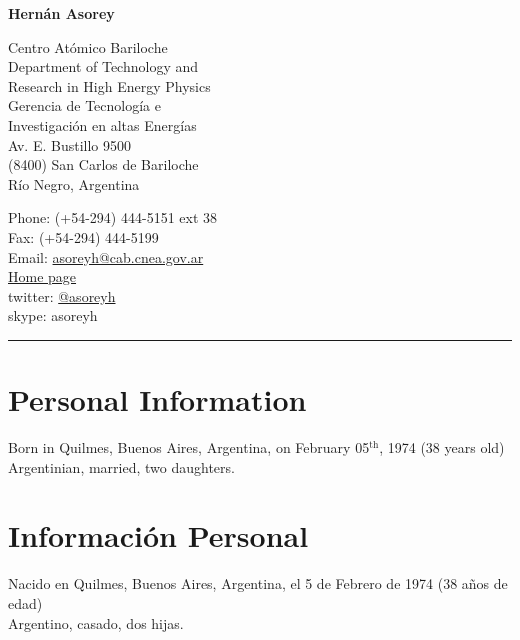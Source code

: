 \begin{center}{\huge \bf Hernán Asorey}\\[1cm]\end{center}
\begin{minipage}[t]{0.495\textwidth}
  Centro Atómico Bariloche\\
\ifeng
  Department of Technology and\\
  Research in High Energy Physics\\
\else
  Gerencia de Tecnología e \\
  Investigación en altas Energías\\
\fi
  Av. E. Bustillo 9500\\
  (8400) San Carlos de Bariloche\\
  Río Negro, Argentina\\[.2cm]
\end{minipage}
\begin{minipage}[t]{0.495\textwidth}
  Phone: (+54-294) 444-5151 ext 38\\
  Fax: (+54-294) 444-5199\\
  Email: \href{mailto:asoreyh@cab.cnea.gov.ar}{asoreyh@cab.cnea.gov.ar}\\
  \href{http://fisica.cab.cnea.gov.ar/particulas/wiki/User:Asoreyh}{Home page}\\
  twitter: \href{https://twitter.com/#!/asoreyh}{@asoreyh}\\
  skype: asoreyh\\
\end{minipage}
\hrule
\ifeng
\section*{Personal Information}
Born in Quilmes, Buenos Aires, Argentina, on February 05$^\mathrm{th}$, 1974 (38 years old)\\
Argentinian, married, two daughters.
\else
\section*{Información Personal}
Nacido en Quilmes, Buenos Aires, Argentina, el 5 de Febrero de 1974 (38 años de edad)\\
Argentino, casado, dos hijas.
\fi
